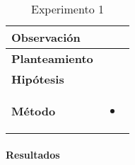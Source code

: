 \begin{table}[H]
    \centering
    \begin{tabularx}{\textwidth}{|p{4cm}|X|} %
        \hline %
        \textbf{Observación} &  
        \\ \hline 
        \textbf{Planteamiento} & 
        \\ \hline 
        \textbf{Hipótesis} & 
        \\ \hline 
        \textbf{Método} & 
        \begin{itemize}
            \item 
        \end{itemize}
        \\ \hline
    \end{tabularx}
    \caption{Experimento 1}
    \label{tab:tabla1}
\end{table}

\paragraph{Resultados}